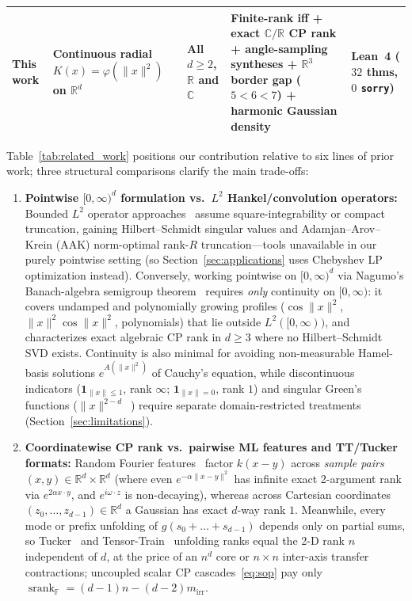 \documentclass[11pt,a4paper]{article}
\theoremstyle{plain}
\theoremstyle{definition}
\newcommand{\R}{\mathbb{R}}
\newcommand{\C}{\mathbb{C}}
\newcommand{\Field}{\mathbb{F}}
\DeclareMathOperator{\srank}{srank}
\begin{document}
\begin{table}[t]
{\begin{tabular}{@{}>{\raggedright\arraybackslash}p{3.0cm}>{\raggedright\arraybackslash}p{2.8cm}>{\raggedright\arraybackslash}p{2.2cm}>{\raggedright\arraybackslash}p{4.4cm}>{\raggedright\arraybackslash}p{2.1cm}@{}}
\textbf{This work} & Continuous radial $K(x) = \varphi(\|x\|^2)$ on $\R^d$ & All $d \ge 2$, $\R$ and $\C$ & Finite-rank iff + exact $\C/\R$ CP rank + angle-sampling syntheses + $\R^3$ border gap ($5{<}6{<}7$) + harmonic Gaussian density & \textbf{Lean~4} ($32$ thms, $0$ \texttt{sorry}) \\
\bottomrule
\end{tabular}}
\end{table}

Table~\ref{tab:related_work} positions our contribution relative to six lines of prior work; three structural comparisons clarify the main trade-offs:
\begin{enumerate}[leftmargin=1.8em,itemsep=2pt]
  \item \textbf{Pointwise $[0,\infty)^d$ formulation vs.\ $L^2$ Hankel/convolution operators:} Bounded $L^2$ operator approaches~\cite{rochberg1987toeplitz,andersson2015truncated,townsend2015continuous,wathen2015eigenvalues,tyrtyshnikov2000incomplete} assume square-integrability or compact truncation, gaining Hilbert--Schmidt singular values and Adamjan--Arov--Krein (AAK) norm-optimal rank-$R$ truncation---tools unavailable in our purely pointwise setting (so Section~\ref{sec:applications} uses Chebyshev LP optimization instead). Conversely, working pointwise on $[0,\infty)^d$ via Nagumo's Banach-algebra semigroup theorem~\cite{nagumo1936einige,engel2000one,stone1960,laczkovich2020} requires \emph{only} continuity on $[0,\infty)$: it covers undamped and polynomially growing profiles ($\cos\|x\|^2$, $\|x\|^2\cos\|x\|^2$, polynomials) that lie outside $L^2([0,\infty))$, and characterizes exact algebraic CP rank in $d \ge 3$ where no Hilbert--Schmidt SVD exists. Continuity is also minimal for avoiding non-measurable Hamel-basis solutions $e^{A(\|x\|^2)}$ of Cauchy's equation, while discontinuous indicators ($\mathbf{1}_{\|x\|\le 1}$, rank $\infty$; $\mathbf{1}_{\|x\|=0}$, rank $1$) and singular Green's functions ($\|x\|^{2-d}$~\cite{braess2005approximation,greengard1991fast,liang2021kernel,khoromskij2018tensor}) require separate domain-restricted treatments (Section~\ref{sec:limitations}).
  \item \textbf{Coordinatewise CP rank vs.\ pairwise ML features and TT/Tucker formats:} Random Fourier features~\cite{rahimi2007random} factor $k(x - y)$ across \emph{sample pairs} $(x, y) \in \R^d \times \R^d$ (where even $e^{-\alpha\|x - y\|^2}$ has infinite exact 2-argument rank via $e^{2\alpha x\cdot y}$, and $e^{i\omega\cdot z}$ is non-decaying), whereas across Cartesian coordinates $(z_0,\dots,z_{d-1}) \in \R^d$ a Gaussian has exact $d$-way rank $1$. Meanwhile, every mode or prefix unfolding of $g(s_0 + \dots + s_{d-1})$ depends only on partial sums, so Tucker~\cite{kolda2009tensor,hackbusch2012tensor} and Tensor-Train~\cite{oseledets2011tensor} unfolding ranks equal the 2-D rank $n$ independent of $d$, at the price of an $n^d$ core or $n \times n$ inter-axis transfer contractions; uncoupled scalar CP cascades~\eqref{eq:sop} pay only $\srank_{\Field} = (d - 1)n - (d - 2)m_{\mathrm{irr}}$.

\end{enumerate}
\end{document}
